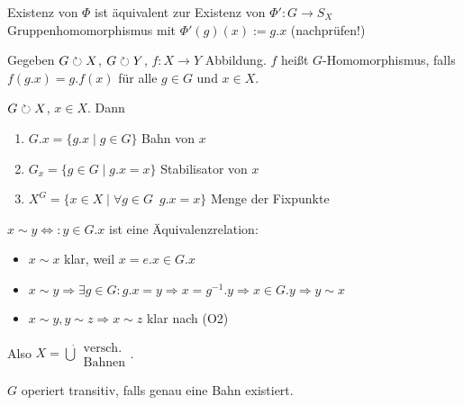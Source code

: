 \documentclass[12pt,a4paper]{scrartcl}
\begin{document}
\begin{bem}
	Existenz von $\Phi$ ist äquivalent zur Existenz von $\Phi'\colon G\to S_X$ Gruppenhomomorphismus mit $\Phi'(g)(x) := g.x$ (nachprüfen!)
\end{bem}

\begin{defi}
	Gegeben $G\circlearrowright X$, $G\circlearrowright Y$, $f\colon X\to Y$ Abbildung. $f$ heißt $G$-Homomorphismus, falls $f(g.x) = g.f(x)$ für alle $g\in G$ und $x\in X$.
\end{defi}

\begin{defi}
	$G\circlearrowright X$, $x\in X$. Dann\begin{enumerate}
		\item $G.x = \{g.x\mid g\in G\}$ Bahn von $x$
		\item $G_x = \{g\in G\mid g.x = x\}$ Stabilisator von $x$
		\item $X^G = \{x\in X\mid \forall g\in G\enspace g.x = x\}$ Menge der Fixpunkte
	\end{enumerate}
\end{defi}

\begin{bem}
	$x\sim y \Leftrightarrow : y\in G.x$ ist eine Äquivalenzrelation:\begin{itemize}
		\item $x\sim x$ klar, weil $x = e.x\in G.x$
		\item $x\sim y\Rightarrow \exists g\in G: g.x = y\Rightarrow x = g^{-1}.y\Rightarrow x\in G.y\Rightarrow y\sim x$
		\item $x\sim y, y\sim z\Rightarrow x\sim z$ klar nach (O2)
	\end{itemize}
	Also $X=\dot\bigcup\substack{\text{versch.}\\\text{Bahnen}}$.
\end{bem}

\begin{defi}
	$G$ operiert transitiv, falls genau eine Bahn existiert.
\end{defi}
\end{document}
